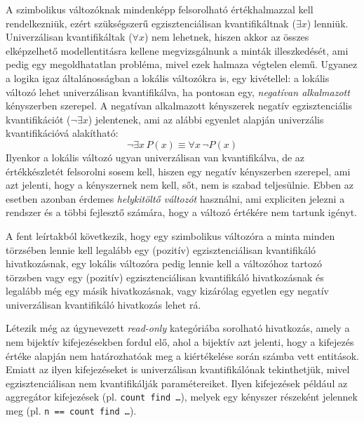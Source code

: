 A szimbolikus változóknak mindenképp felsorolható értékhalmazzal kell rendelkezniük, ezért szükségszerű egzisztenciálisan kvantifikáltnak ($\exists x$) lenniük.
Univerzálisan kvantifikáltak ($\forall x$) nem lehetnek, hiszen akkor az összes elképzelhető modellentitásra kellene megvizsgálnunk a minták illeszkedését, ami pedig egy megoldhatatlan probléma, mivel ezek halmaza végtelen elemű.
Ugyanez a logika igaz általánosságban a lokális változókra is, egy kivétellel: a lokális változó lehet univerzálisan kvantifikálva, ha pontosan egy, \emph{negatívan alkalmazott} kényszerben szerepel.
A negatívan alkalmazott kényszerek negatív egzisztenciális kvantifikációt ($\neg\exists x$) jelentenek, ami az alábbi egyenlet alapján univerzális kvantifikációvá alakítható:
\begin{equation} \label{eq:negexiststoforall}
\neg\exists x\, P(x) \equiv \forall x\, \neg P(x)
\end{equation}
Ilyenkor a lokális változó ugyan univerzálisan van kvantifikálva, de az értékkészletét felsorolni sosem kell, hiszen egy negatív kényszerben szerepel, ami azt jelenti, hogy a kényszernek nem kell, sőt, nem is szabad teljesülnie. Ebben az esetben azonban érdemes \emph{helykitöltő változót} használni, ami expliciten jelezni a rendszer és a többi fejlesztő számára, hogy a változó értékére nem tartunk igényt.

A fent leírtakból következik, hogy egy szimbolikus változóra a minta minden törzsében lennie kell legalább egy (pozitív) egzisztenciálisan kvantifikáló hivatkozásnak, egy lokális változóra pedig lennie kell a változóhoz tartozó törzsben vagy egy (pozitív) egzisztenciálisan kvantifikáló hivatkozásnak és legalább még egy másik hivatkozásnak, vagy kizárólag egyetlen egy negatív univerzálisan kvantifikáló hivatkozás lehet rá.

Létezik még az úgynevezett \emph{read-only} kategóriába sorolható hivatkozás, amely a nem bijektív kifejezésekben fordul elő, ahol a bijektív azt jelenti, hogy a kifejezés értéke alapján nem határozhatóak meg a kiértékelése során számba vett entitások.
Emiatt az ilyen kifejezéseket is univerzálisan kvantifikálónak tekinthetjük, mivel egzisztenciálisan nem kvantifikálják paramétereiket.
Ilyen kifejezések például az aggregátor kifejezések (pl. \mbox{\texttt{count find \ldots}}), melyek egy kényszer részeként jelennek meg (pl. \mbox{\texttt{n == count find \ldots}}).

